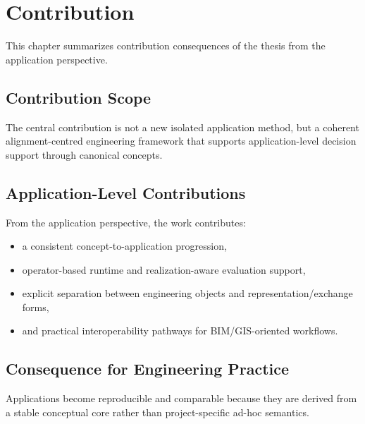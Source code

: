 
\chapter{Contribution}

\label{chap:applications-contribution}

This chapter summarizes contribution consequences of the thesis from the
application perspective.

\section{Contribution Scope}

The central contribution is not a new isolated application method, but a
coherent alignment-centred engineering framework that supports
application-level decision support through canonical concepts.

\section{Application-Level Contributions}

From the application perspective, the work contributes:
\begin{itemize}
\item a consistent concept-to-application progression,
\item operator-based runtime and realization-aware evaluation support,
\item explicit separation between engineering objects and
representation/exchange forms,
\item and practical interoperability pathways for BIM/GIS-oriented
workflows.
\end{itemize}

\section{Consequence for Engineering Practice}

Applications become reproducible and comparable because they are derived
from a stable conceptual core rather than project-specific ad-hoc
semantics.

